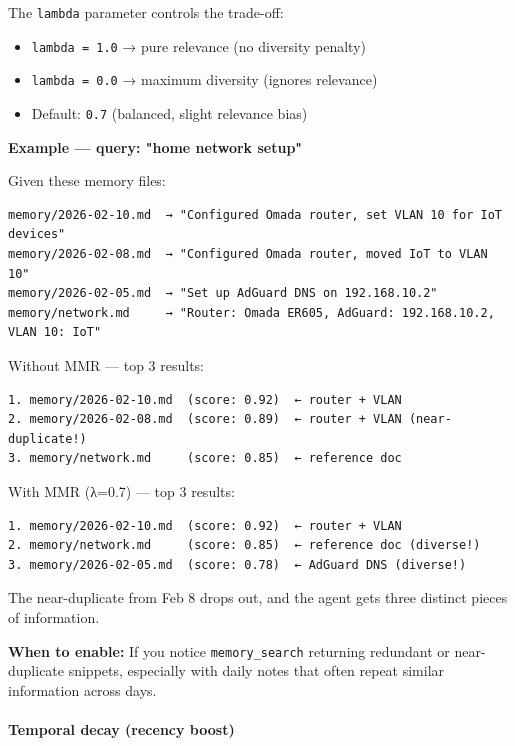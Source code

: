 The \texttt{lambda} parameter controls the trade-off:

\begin{itemize}
  \item \texttt{lambda = 1.0} → pure relevance (no diversity penalty)
  \item \texttt{lambda = 0.0} → maximum diversity (ignores relevance)
  \item Default: \texttt{0.7} (balanced, slight relevance bias)
\end{itemize}


\textbf{Example — query: "home network setup"}

Given these memory files:

\begin{lstlisting}
memory/2026-02-10.md  → "Configured Omada router, set VLAN 10 for IoT devices"
memory/2026-02-08.md  → "Configured Omada router, moved IoT to VLAN 10"
memory/2026-02-05.md  → "Set up AdGuard DNS on 192.168.10.2"
memory/network.md     → "Router: Omada ER605, AdGuard: 192.168.10.2, VLAN 10: IoT"
\end{lstlisting}


Without MMR — top 3 results:

\begin{lstlisting}
1. memory/2026-02-10.md  (score: 0.92)  ← router + VLAN
2. memory/2026-02-08.md  (score: 0.89)  ← router + VLAN (near-duplicate!)
3. memory/network.md     (score: 0.85)  ← reference doc
\end{lstlisting}


With MMR (λ=0.7) — top 3 results:

\begin{lstlisting}
1. memory/2026-02-10.md  (score: 0.92)  ← router + VLAN
2. memory/network.md     (score: 0.85)  ← reference doc (diverse!)
3. memory/2026-02-05.md  (score: 0.78)  ← AdGuard DNS (diverse!)
\end{lstlisting}


The near-duplicate from Feb 8 drops out, and the agent gets three distinct pieces of information.

\textbf{When to enable:} If you notice \texttt{memory\_search} returning redundant or near-duplicate snippets,
especially with daily notes that often repeat similar information across days.

\paragraph{Temporal decay (recency boost)}


